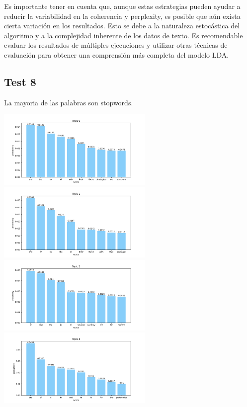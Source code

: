 \documentclass[10pt]{article} %
\begin{document}
	Es importante tener en cuenta que, aunque estas estrategias pueden ayudar a reducir la variabilidad en la coherencia y perplexity, es posible que aún exista cierta variación en los resultados. Esto se debe a la naturaleza estocástica del algoritmo y a la complejidad inherente de los datos de texto. Es recomendable evaluar los resultados de múltiples ejecuciones y utilizar otras técnicas de evaluación para obtener una comprensión más completa del modelo LDA.
	
	\subsection{Test 8}
	
	La mayoria de las palabras son stopwords.
	
	\begin{center}
		\includegraphics[width=7.5cm]{images/plots/test_8/topic_0.png}
		\includegraphics[width=7.5cm]{images/plots/test_8/topic_1.png}
		\includegraphics[width=7.5cm]{images/plots/test_8/topic_2.png}
		\includegraphics[width=7.5cm]{images/plots/test_8/topic_3.png}

\end{center}
\end{document}
